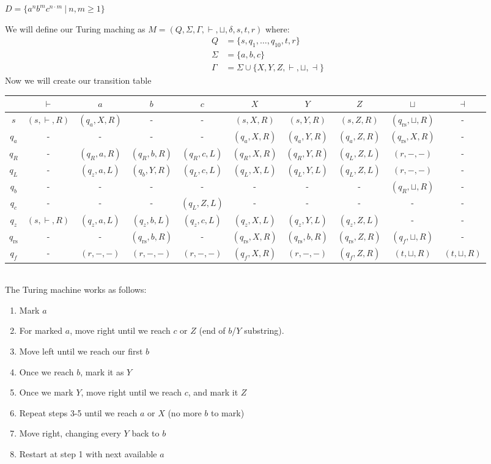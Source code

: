 \documentclass[letterpaper]{article}
\theoremstyle{plain}
\theoremstyle{definition}
\theoremstyle{remark}
\begin{document}
\section{}
\begin{center}
    $D=\{a^nb^mc^{n\cdot{m}}~|~n,m\geq1\}$    
\end{center}
We will define our Turing maching as $M=(Q,\Sigma,\Gamma,\vdash,\sqcup,\delta,s,t,r)$ where:
\begin{align*}
    Q&=\{s,q_1,\ldots,q_{10},t,r\}\\
    \Sigma&=\{a,b,c\}\\
    \Gamma&=\Sigma\cup\{X,Y,Z,\vdash,\sqcup,\dashv\}
\end{align*}
Now we will create our transition table\\[1em]
\begin{tabular}{c | c c c c c c c c c}
    & $\vdash$ & $a$ & $b$ & $c$ & $X$ & $Y$ & $Z$ & $\sqcup$ & $\dashv$ \\
    \hline
    $s$ & $(s,\vdash,R)$ & $(q_a,X,R)$&-&-&$(s,X,R)$&$(s,Y,R)$&$(s,Z,R)$&$(q_{\text{rs}},\sqcup,R)$&-\\
    $q_a$ & -&-&-&-&$(q_a,X,R)$&$(q_a,Y,R)$& $(q_a,Z,R)$ & $(q_{\text{rs}},X,R)$&-\\
    $q_R$&-&$(q_R,a,R)$&$(q_R,b,R)$&$(q_R,c,L)$&$(q_R,X,R)$&$(q_R,Y,R)$&$(q_L,Z,L)$&$(r,-,-)$&-\\
    $q_L$&-&$(q_z,a,L)$&$(q_b,Y,R)$&$(q_L,c,L)$&$(q_L,X,L)$&$(q_L,Y,L)$&$(q_L,Z,L)$&$(r,-,-)$&-\\
    $q_b$&-&-&-&-&-&-&-&$(q_R,\sqcup,R)$&-\\
    $q_c$&-&-&-&$(q_L,Z,L)$&-&-&-&-&-\\
    $q_z$&$(s,\vdash,R)$&$(q_z,a,L)$&$(q_z,b,L)$&$(q_z,c,L)$&$(q_z,X,L)$&$(q_z,Y,L)$&$(q_z,Z,L)$&-&-\\
    $q_{\text{rs}}$&-&-&$(q_{\text{rs}},b,R)$&-&$(q_{\text{rs}},X,R)$&$(q_{\text{rs}},b,R)$&$(q_{\text{rs}},Z,R)$&$(q_f,\sqcup,R)$&-\\
    $q_f$&-&$(r,-,-)$&$(r,-,-)$&$(r,-,-)$&$(q_f,X,R)$&$(r,-,-)$&$(q_f,Z,R)$&$(t,\sqcup,R)$&$(t,\sqcup,R)$
\end{tabular}\\[1em]
The Turing machine works as follows:
\begin{enumerate}
    \item Mark $a$
    \item For marked $a$, move right until we reach $c$ or $Z$ (end of $b$/$Y$ substring).
    \item Move left until we reach our first $b$
    \item Once we reach $b$, mark it as $Y$
    \item Once we mark $Y$, move right until we reach $c$, and mark it $Z$
    \item Repeat steps 3-5 until we reach $a$ or $X$ (no more $b$ to mark)
    \item Move right, changing every $Y$ back to $b$
    \item Restart at step 1 with next available $a$
\end{enumerate}
\end{document}
